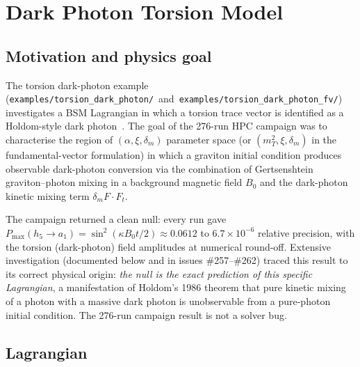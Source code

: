
\section{Dark Photon Torsion Model}
\label{sec:dark-photon-torsion}

\subsection{Motivation and physics goal}
\label{subsec:dp-motivation}

The torsion dark-photon example
(\texttt{examples/torsion\_dark\_photon/}~and~\texttt{examples/torsion\_dark\_photon\_fv/})
investigates a BSM Lagrangian in which a torsion trace vector is
identified as a Holdom-style dark photon~\cite{Holdom1986}. The goal of
the 276-run HPC campaign was to characterise the region of
$(\alpha, \xi, \delta_m)$ parameter space (or $(m_T^2, \xi, \delta_m)$
in the fundamental-vector formulation) in which a graviton initial
condition produces observable dark-photon conversion via the
combination of Gertsenshtein~\cite{gertsenshtein1962wave} graviton--photon
mixing in a background magnetic field $B_0$ and the
dark-photon kinetic mixing term $\delta_m F \cdot F_t$.

The campaign returned a clean null: every run gave
$P_{\max}(h_5 \to a_1) = \sin^2(\kappa B_0 t / 2) \approx 0.0612$ to
$6.7 \times 10^{-6}$ relative precision, with the torsion (dark-photon)
field amplitudes at numerical round-off. Extensive investigation
(documented below and in issues \#257--\#262) traced this result to
its correct physical origin: \emph{the null is the exact prediction of
this specific Lagrangian}, a manifestation of Holdom's 1986 theorem
that pure kinetic mixing of a photon with a massive dark photon is
unobservable from a pure-photon initial condition. The
276-run campaign result is not a solver bug.

\subsection{Lagrangian}
\label{subsec:dp-lagrangian}

